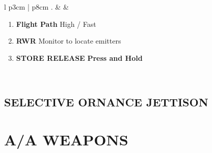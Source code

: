 \documentclass[8pt,usenames,dvipsnames,twoside]{article}
\begin{document}
\begin{center}
\begin{tabular}{l p{3cm} | p{8cm}}
				. &  &
				\begin{minipage}[t]{\linewidth}
					\vspace{-7pt}
					\begin{enumerate}[label=(\alph*)]
						\item \textbf{Flight Path} \dotfill High / Fast
						\item \textbf{RWR} \dotfill Monitor to locate emitters
						\item \textbf{STORE RELEASE} \dotfill \textbf{Press and Hold}
					\end{enumerate}
				\end{minipage} \\
				\bottomrule
			\end{tabular}
		\end{center}
	
		\subsection{SELECTIVE ORNANCE JETTISON}
	
		\cleardoublepage
		
		\section{A/A WEAPONS}
		
\end{document}
